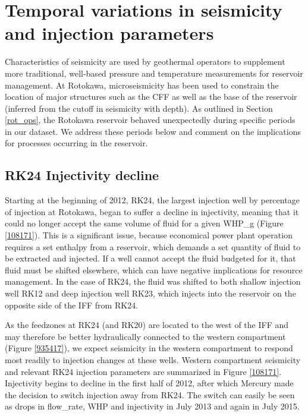 \section{Temporal variations in seismicity and injection parameters}\label{temporal}
Characteristics of seismicity are used by geothermal operators to supplement more traditional, well-based pressure and temperature measurements for reservoir management. At Rotokawa, microseismicity has been used to constrain the location of major structures such as the \acrshort{CFF} as well as the base of the reservoir (inferred from the cutoff in seismicity with depth). As outlined in Section \ref{rot_ops}, the Rotokawa reservoir behaved unexpectedly during specific periods in our dataset. We address these periods below and comment on the implications for processes occurring in the reservoir.

\subsection{RK24 Injectivity decline}
Starting at the beginning of 2012, RK24, the largest injection well by percentage of injection at Rotokawa, began to suffer a decline in \gls{injectivity}, meaning that it could no longer accept the same volume of fluid for a given \gls{WHP_g} (Figure \ref{108171}). This is a significant issue, because economical power plant operation requires a set enthalpy from a reservoir, which demands a set quantity of fluid to be extracted and injected. If a well cannot accept the fluid budgeted for it, that fluid must be shifted elsewhere, which can have negative implications for resource management. In the case of RK24, the fluid was shifted to both shallow injection well RK12 and deep injection well RK23, which injects into the reservoir on the opposite side of the \acrshort{IFF} from RK24.

As the \glspl{feedzone} at RK24 (and RK20) are located to the west of the \acrshort{IFF} and may therefore be better hydraulically connected to the western compartment (Figure \ref{935417}), we expect seismicity in the western compartment to respond most readily to injection changes at these wells. Western compartment seismicity and relevant RK24 injection parameters are summarized in Figure \ref{108171}. Injectivity begins to decline in the first half of 2012, after which Mercury made the decision to switch injection away from RK24. The switch can easily be seen as drops in \gls{flow_rate}, \acrfull{WHP} and \gls{injectivity} in July 2013 and again in July 2015.

